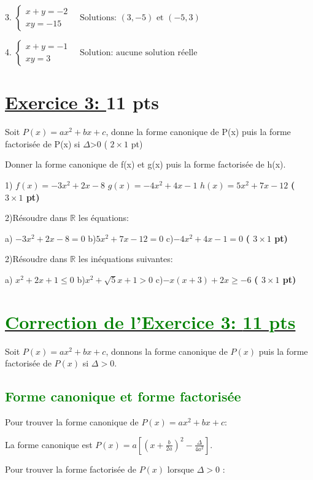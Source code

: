 \documentclass[12pt]{article}
\begin{document}
3. \( \begin{cases}
x + y = -2 \\
xy = -15
\end{cases} \quad \text{Solutions: } (3, -5) \text{ et } (-5, 3) \)

4. \( \begin{cases}
x + y = -1 \\
xy = 3
\end{cases} \quad \text{Solution: aucune solution réelle} \)


\section*{\underline{Exercice 3: }\textbf{11 pts}}
Soit $P(x)=ax^{2}+bx+c$, donne la forme canonique de P(x) puis la forme factorisée de P(x) si $\Delta$>0 ( $2\times 1$ pt)

Donner la forme canonique de f(x) et g(x) puis la forme factorisée de h(x).
  
1) $f(x)=-3x^{2}+2x-8$     $g(x)=-4x^{2}+4x-1$    $h(x)=5x^{2}+7x-12$ \textbf{( $3\times 1$ pt)}

2)Résoudre dans $\mathbb{R}$ les équations:

a) $-3x^{2}+2x-8=0$     b)$5x^{2}+7x-12=0$    c)$-4x^{2}+4x-1=0$ \textbf{( $3\times 1$ pt)}

2)Résoudre dans $\mathbb{R}$ les inéquations suivantes:

a) $x^{2}+2x+1\leq 0$     b)$x^{2}+\sqrt{5} x+1>0$    c)$-x(x+3)+2x\geq -6$ \textbf{( $3\times 1$ pt)}
\section*{\underline{\textcolor{green}{Correction de l'Exercice 3: \textbf{11 pts}}}}

Soit \( P(x) = ax^{2} + bx + c \), donnons la forme canonique de \( P(x) \) puis la forme factorisée de \( P(x) \) si \( \Delta > 0 \).

\subsection*{\textcolor{green}{Forme canonique et forme factorisée}}

Pour trouver la forme canonique de \( P(x) = ax^{2} + bx + c \):

La forme canonique est \( P(x) = a\left[ \left( x + \frac{b}{2a}\right) ^{2} - \frac{\Delta}{4a^{2}}\right]  \).

Pour trouver la forme factorisée de \( P(x) \) lorsque \( \Delta > 0 \) :
\end{document}
